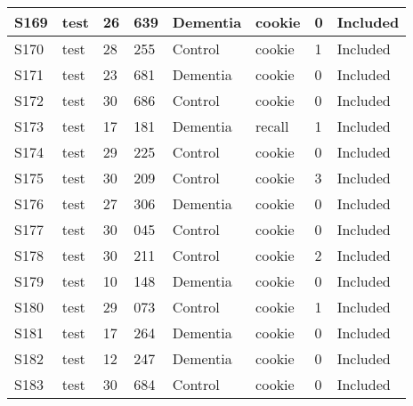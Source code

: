 \begin{center}
\begin{longtable}{|l|l|l|l|l|l|l|l|}
S169           & test                  & 26              & 639     & Dementia       & cookie          & 0            & Included      \\ \hline
S170           & test                  & 28              & 255     & Control        & cookie          & 1            & Included      \\ \hline
S171           & test                  & 23              & 681     & Dementia       & cookie          & 0            & Included      \\ \hline
S172           & test                  & 30              & 686     & Control        & cookie          & 0            & Included      \\ \hline
S173           & test                  & 17              & 181     & Dementia       & recall          & 1            & Included      \\ \hline
S174           & test                  & 29              & 225     & Control        & cookie          & 0            & Included      \\ \hline
S175           & test                  & 30              & 209     & Control        & cookie          & 3            & Included      \\ \hline
S176           & test                  & 27              & 306     & Dementia       & cookie          & 0            & Included      \\ \hline
S177           & test                  & 30              & 045     & Control        & cookie          & 0            & Included      \\ \hline
S178           & test                  & 30              & 211     & Control        & cookie          & 2            & Included      \\ \hline
S179           & test                  & 10              & 148     & Dementia       & cookie          & 0            & Included      \\ \hline
S180           & test                  & 29              & 073     & Control        & cookie          & 1            & Included      \\ \hline
S181           & test                  & 17              & 264     & Dementia       & cookie          & 0            & Included      \\ \hline
S182           & test                  & 12              & 247     & Dementia       & cookie          & 0            & Included      \\ \hline
S183           & test                  & 30              & 684     & Control        & cookie          & 0            & Included      \\ \hline

\end{longtable}
\end{center}
